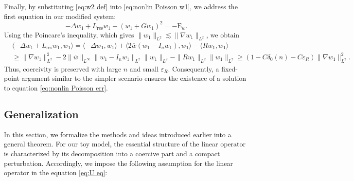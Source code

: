 \documentclass[11pt,a4paper]{article}
\numberwithin{equation}{section}
\newcommand{\Epsilon}{\mathrm{E}}
\newcommand{\tmop}[1]{\ensuremath{\operatorname{#1}}}
\begin{document}
Finally, by substituting \eqref{eq:w2 def} into \eqref{eq:nonlin Poisson w1}, we address the first equation in our modified system:
\[ - \Delta w_1 + L_{\tmop{res}} w_1 + (w_1 + G w_1)^2 = - \Epsilon_w .
\]
Using the Poincare's inequality, which gives $\| w_1 \|_{L^2} \lesssim \|\nabla w_1 \|_{L^2}$, we obtain
\[\begin{aligned}
  &\langle - \Delta w_1 + L_{\tmop{res}} w_1, w_1 \rangle  =  \langle -
  \Delta w_1, w_1 \rangle + \langle 2 \overline{w} (w_1 - I_n w_1), w_1
  \rangle - \langle R w_1, w_1 \rangle\\
  & \geqslant  \| \nabla w_1 \|_{L^2}^2 - 2 \| \overline{w} \|_{L^\infty} \| w_1
  - I_n w_1 \|_{L^2} \| w_1 \|_{L^2} - \| R w_1 \|_{L^2} \| w_1 \|_{L^2} \geqslant  (1 - C \delta_0 (n)  - C
  \varepsilon_R) \| \nabla w_1 \|_{L^2}^2.
\end{aligned}\]
Thus,
coercivity is preserved with large $n$ and small $\varepsilon_R$.
Consequently, a fixed-point argument similar to the simpler scenario ensures
the existence of a solution to equation \eqref{eq:nonlin Poisson err}.

\subsection{Generalization}\label{sec:general}

In this section, we formalize the methods and ideas introduced earlier into a
general theorem. For our toy model, the essential structure of the linear operator is characterized by its decomposition into a coercive part and a
compact perturbation. Accordingly, we impose the following assumption for the
linear operator in the equation \eqref{eq:U eq}:
\end{document}
